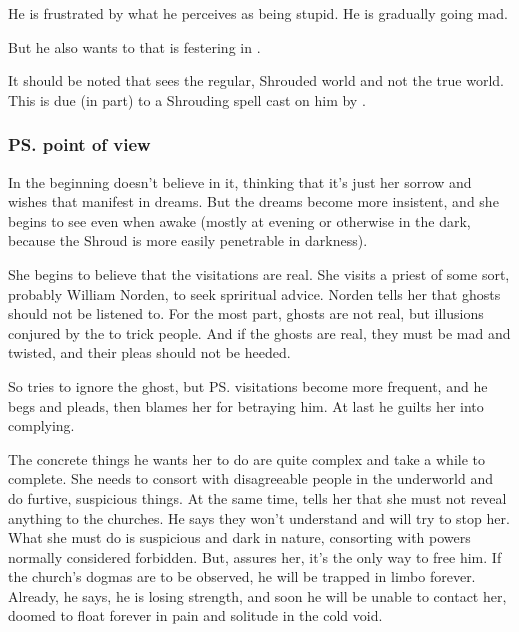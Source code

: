 He is frustrated by what he perceives as \Tiroco{} being stupid. 
He is gradually going mad. 


But he also wants to  that is festering in \Malcur. 

It should be noted that \Icor{} sees the regular, Shrouded world and not the true world. 
This is due (in part) to a Shrouding spell cast on him by \LocarPsyrex. 





\subsubsection{\ps{\Tiroco} point of view}
In the beginning \Tiroco{} doesn't believe in it, thinking that it's just her sorrow and wishes that manifest in dreams. But the dreams become more insistent, and she begins to see \Icor{} even when awake (mostly at evening or otherwise in the dark, because the Shroud is more easily penetrable in darkness). 

She begins to believe that the visitations are real. She visits a priest of some sort, probably William Norden, to seek spriritual advice. Norden tells her that ghosts should not be listened to. For the most part, ghosts are not real, but illusions conjured by the \Qliphoth{} to trick people. And if the ghosts are real, they must be mad and twisted, and their pleas should not be heeded.

So \Tiroco{} tries to ignore the ghost, but \ps{\Icor} visitations become more frequent, and he begs and pleads, then blames her for betraying him. At last he guilts her into complying. 

The concrete things he wants her to do are quite complex and take a while to complete. She needs to consort with disagreeable people in the \Malcurian underworld and do furtive, suspicious things. At the same time, \Icor{} tells her that she must not reveal anything to the churches. He says they won't understand and will try to stop her. What she must do is suspicious and dark in nature, consorting with powers normally considered forbidden. But, \Icor{} assures her, it's the only way to free him. If the church's dogmas are to be observed, he will be trapped in limbo forever. Already, he says, he is losing strength, and soon he will be unable to contact her, doomed to float forever in pain and solitude in the cold void. 

